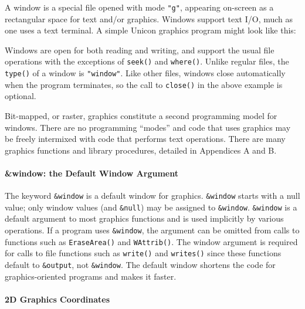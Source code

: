 A window is a special file opened with mode \texttt{"g"}, appearing
on-screen as a rectangular space for text and/or graphics. Windows
support text I/O, much as one uses a text terminal. A simple Unicon
graphics program might look like this:


Windows are open for both reading and writing, and support the usual
file operations with the exceptions of \texttt{seek()} and
\texttt{where()}. Unlike regular files, the \texttt{type()} of a
window is \texttt{"window"}. Like other files, windows close automatically when
the program terminates, so the call to \texttt{close()} in the above
example is optional.

Bit-mapped, or raster, graphics constitute a second programming model
for windows. There are no programming ``modes'' and code that uses
graphics may be freely intermixed with code that performs text
operations. There are many graphics functions and library procedures,
detailed in Appendices A and B.

\paragraph{\&window: the Default Window Argument}

The keyword \texttt{\&window} is a default window for graphics.
\texttt{\&window} starts with a null value; only window values (and
\texttt{\&null}) may be assigned to
\texttt{\&window}. \texttt{\&window} is a default argument to most
graphics functions and is used implicitly by various operations. If a
program uses \texttt{\&window}, the argument can be omitted from calls
to functions such as \texttt{EraseArea()} and \texttt{WAttrib()}. The
window argument is required for calls to file functions such as
\texttt{write()} and \texttt{writes()} since these functions default
to \texttt{\&output}, not \texttt{\&window}. The default window
shortens the code for graphics-oriented programs and makes it faster.

\paragraph{2D Graphics Coordinates}

